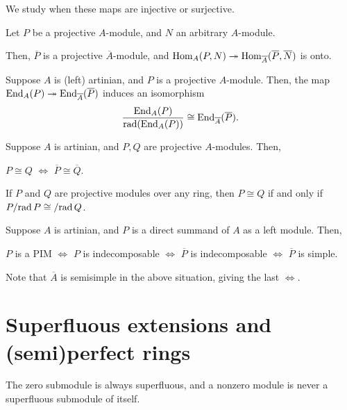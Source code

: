 \documentclass[12pt]{article}
\begin{document}
We study when these maps are injective or surjective.

\begin{thm}
	Let $P$ be a projective $A$-module, and $N$ an arbitrary $A$-module.

	Then, $\overline{P}$ is a projective $\overline{A}$-module, 
	and $\operatorname{Hom}_{A}(P, N) \twoheadrightarrow \operatorname{Hom}_{\overline{A}}(\overline{P}, \overline{N})$ is onto.
\end{thm}

\begin{thm}
	Suppose $A$ is (left) artinian, and $P$ is a projective $A$-module. Then, the map $\operatorname{End}_{A}(P) \twoheadrightarrow \operatorname{End}_{\overline{A}}(\overline{P})$ induces an isomorphism
	\begin{equation*} 
		\frac{\operatorname{End}_{A}(P)}{\operatorname{rad}(\operatorname{End}_{A}(P))} \cong \operatorname{End}_{\overline{A}}(\overline{P}).
	\end{equation*}
\end{thm}
\begin{cor} \label{cor:artinian-projective-isomorphic-mod-radical}
	Suppose $A$ is artinian, and $P, Q$ are projective $A$-modules. Then,
	\begin{center}
		$P \cong Q$ $\Leftrightarrow$ $\overline{P} \cong \overline{Q}$.
	\end{center}
\end{cor}

\begin{thm}
	If $P$ and $Q$ are projective modules over any ring, 
	then $P \cong Q$ if and only if $P/{\operatorname{rad} P} \cong /{\operatorname{rad} Q}$.
\end{thm}

\begin{thm} \label{thm:artinian-PIM-criteria}
	Suppose $A$ is artinian, and $P$ is a direct summand of $A$ as a left module. Then,
	\begin{center}
		$P$ is a PIM $\Leftrightarrow$ $P$ is indecomposable $\Leftrightarrow$ $\overline{P}$ is indecomposable $\Leftrightarrow$ $\overline{P}$ is simple.
	\end{center}
\end{thm}
Note that $\overline{A}$ is semisimple in the above situation, giving the last $\Leftrightarrow$. 

\section{Superfluous extensions and (semi)perfect rings}

\begin{thm}
	The zero submodule is always superfluous, and a nonzero module is never a superfluous submodule of itself. 
\end{thm}
\end{document}
